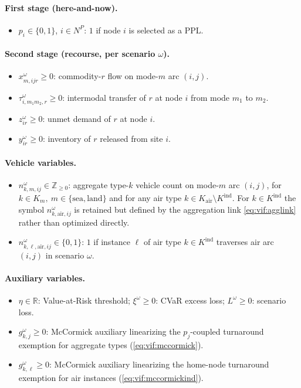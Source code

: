 \paragraph{First stage (here-and-now).}
\begin{itemize}
  \item $p_i \in \{0,1\}$, $i \in N^P$: $1$ if node $i$ is selected as a PPL.
\end{itemize}

\paragraph{Second stage (recourse, per scenario $\omega$).}
\begin{itemize}
  \item $x^\omega_{m,ijr} \geq 0$: commodity-$r$ flow on mode-$m$ arc $(i,j)$.
  \item $\tau^\omega_{i,m_1m_2,r} \geq 0$: intermodal transfer of $r$ at node
        $i$ from mode $m_1$ to $m_2$.
  \item $z^\omega_{ir} \geq 0$: unmet demand of $r$ at node $i$.
  \item $y^\omega_{ir} \geq 0$: inventory of $r$ released from site $i$.
\end{itemize}

\paragraph{Vehicle variables.}
\begin{itemize}
  \item $n^\omega_{k,m,ij} \in \mathbb{Z}_{\geq 0}$: aggregate type-$k$ vehicle
        count on mode-$m$ arc $(i,j)$, for
        $k \in K_m,\ m \in \{\text{sea},\text{land}\}$ and for any air type
        $k \in K_{\mathrm{air}} \setminus K^{\mathrm{ind}}$. For
        $k \in K^{\mathrm{ind}}$ the symbol $n^\omega_{k,\text{air},ij}$ is
        retained but defined by the aggregation link
        \eqref{eq:vif:agglink} rather than optimized directly.
  \item $n^\omega_{k,\ell,\text{air},ij} \in \{0,1\}$: $1$ if instance $\ell$
        of air type $k \in K^{\mathrm{ind}}$ traverses air arc $(i,j)$ in
        scenario $\omega$.
\end{itemize}

\paragraph{Auxiliary variables.}
\begin{itemize}
  \item $\eta \in \mathbb{R}$: Value-at-Risk threshold; $\xi^\omega \geq 0$:
        CVaR excess loss; $L^\omega \geq 0$: scenario loss.
  \item $g^\omega_{k,j} \geq 0$: McCormick auxiliary linearizing the
        $p_j$-coupled turnaround exemption for aggregate types
        (\eqref{eq:vif:mccormick}).
  \item $g^\omega_{k,\ell} \geq 0$: McCormick auxiliary linearizing the
        home-node turnaround exemption for air instances
        (\eqref{eq:vif:mccormickind}).
\end{itemize}

